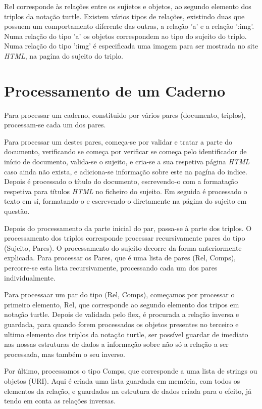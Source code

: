 \documentclass[a4paper]{report}
\begin{document}
Rel corresponde às relações entre os sujietos e objetos, ao segundo elemento dos
triplos da notação turtle. Existem vários tipos de relações, existindo duas que
possuem um comportamento diferente das outras, a relação 'a' e a relação ':img'.
Numa relação do tipo 'a' os objetos correspondem ao tipo do sujeito do triplo.
Numa relação do tipo ':img' é especificada uma imagem para ser mostrada no site
\textit{HTML}, na pagína do sujeito do triplo.

\section{Processamento de um Caderno}

Para processar um caderno, constituido por vários pares (documento, triplos),
processam-se cada um dos pares.

Para processar um destes pares, começa-se por validar e tratar a parte do
documento, verificando se começa por verificar se começa pelo identificador de
início de documento, valida-se o sujeito, e cria-se a sua respetiva página
\textit{HTML} caso ainda não exista, e adiciona-se informação sobre este na
pagína do indice. Depois é processado o título do documento, escrevendo-o com a
formatação respetiva para títulos \textit{HTML} no ficheiro do sujeito. Em
seguida é processado o texto em sí, formatando-o e escrevendo-o diretamente na
página do sujeito em questão.

Depois do processamento da parte inicial do par, passa-se à parte dos triplos.
O processamento dos triplos corresponde processar recursivamente pares do tipo
(Sujeito, Pares). O processamento do sujeito decorre da forma anteriormente
explicada. Para processar os Pares, que é uma lista de pares (Rel, Comps),
percorre-se esta lista recursivamente, processando cada um dos pares
individualmente.

Para processaar um par do tipo (Rel, Comps), começamos por processar o primeiro
elemento, Rel, que corresponde ao segundo elemento dos tripos em notação turtle.
Depois de validada pelo flex, é procurada a relação inversa e guardada, para
quando forem processados os objetos presentes no terceiro e ultimo elemento dos
triplos da notação turtle, ser possível guardar de imediato nas nossas 
estruturas de dados a informação sobre não só a relação a ser processada, mas
também o seu inverso.

Por último, processamos o tipo Comps, que corresponde a uma lista de strings ou
objetos (URI). Aqui é criada uma lista guardada em memória, com todos os
elementos da relação, e guardados na estrutura de dados criada para o efeito,
já tendo em conta as relações inversas.
\end{document}
